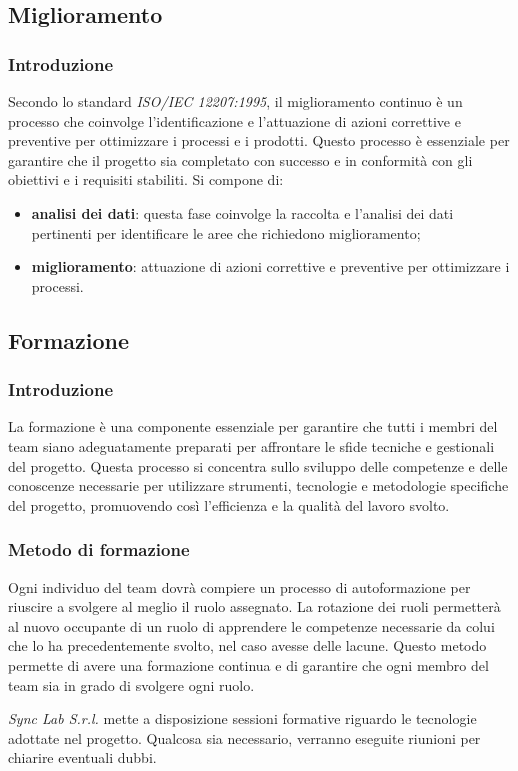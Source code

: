 \subsection{Miglioramento}
\subsubsection{Introduzione}
Secondo lo standard \textit{ISO/IEC 12207:1995}, il miglioramento continuo è un processo che coinvolge l'identificazione e l'attuazione di azioni correttive e preventive per ottimizzare i processi e i prodotti. Questo processo è essenziale per garantire che il progetto sia completato con successo e in conformità con gli obiettivi e i requisiti stabiliti. Si compone di:
\begin{itemize}
    \item \textbf{analisi dei dati}: questa fase coinvolge la raccolta e l'analisi dei dati pertinenti per identificare le aree che richiedono miglioramento;
    \item \textbf{miglioramento}: attuazione di azioni correttive e preventive per ottimizzare i processi.
\end{itemize}

\subsection{Formazione}
\subsubsection{Introduzione}
La formazione è una componente essenziale per garantire che tutti i membri del team siano adeguatamente preparati per affrontare le sfide tecniche e gestionali del progetto. Questa processo si concentra sullo sviluppo delle competenze e delle conoscenze necessarie per utilizzare strumenti, tecnologie e metodologie specifiche del progetto, promuovendo così l'efficienza e la qualità del lavoro svolto.

\subsubsection{Metodo di formazione}
Ogni individuo del team dovrà compiere un processo di autoformazione per riuscire a svolgere al meglio il ruolo assegnato. La rotazione dei ruoli permetterà al nuovo occupante di un ruolo di apprendere le competenze necessarie da colui che lo ha precedentemente svolto, nel caso avesse delle lacune. Questo metodo permette di avere una formazione continua e di garantire che ogni membro del team sia in grado di svolgere ogni ruolo.

\textit{Sync Lab S.r.l.} mette a disposizione sessioni formative riguardo le tecnologie adottate nel progetto.
Qualcosa sia necessario, verranno eseguite riunioni per chiarire eventuali dubbi.